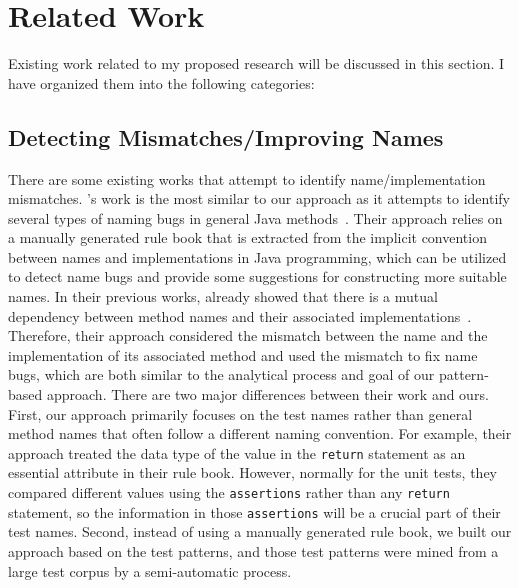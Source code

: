 \section{Related Work}
\label{sec:related-work}

Existing work related to my proposed research will be discussed in this section. I have organized them into the following categories:

\subsection{Detecting Mismatches\slash Improving Names}

There are some existing works that attempt to identify name\slash implementation mismatches.
%
's work is the most similar to our approach as it attempts to identify several types of naming bugs in general Java methods~\cite{host2009debugging}.
%
Their approach relies on a manually generated rule book that is extracted from the implicit convention between names and implementations in Java programming, which can be utilized to detect name bugs and provide some suggestions for constructing more suitable names.
%
In their previous works, \citeauthor{host2008java} already showed that there is a mutual dependency between method names and their associated implementations~\cite{host2008java}.
%
Therefore, their approach considered the mismatch between the name and the implementation of its associated method and used the mismatch to fix name bugs, which are both similar to the analytical process and goal of our pattern-based approach.
%
There are two major differences between their work and ours.
%
First, our approach primarily focuses on the test names rather than general method names that often follow a different naming convention.
%
For example, their approach treated the data type of the value in the \texttt{return} statement as an essential attribute in their rule book.
%
However, normally for the unit tests, they compared different values using the \texttt{assertions} rather than any \texttt{return} statement, so the information in those \texttt{assertions} will be a crucial part of their test names.
%
Second, instead of using a manually generated rule book, we built our approach based on the test patterns, and those test patterns were mined from a large test corpus by a semi-automatic process.


